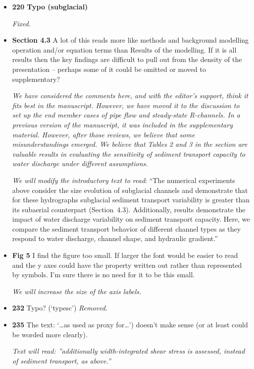 \documentclass[11pt]{article}
\begin{document}
\begin{itemize}
\item \textbf{220 Typo (subglacial)}


  \textit{Fixed.}
  
\item \textbf{Section 4.3} A lot of this reads more like methods and background modelling operation
  and/or equation terms than Results of the modelling. If it is all results then
  the key findings are difficult to pull out from the density of the presentation
  – perhaps some of it could be omitted or moved to supplementary?

  \textit{We have considered the comments here, and with the editor's support, think it fits best in the manuscript.
  However, we have moved it to the discussion to set up the end member cases of pipe flow and steady-state R-channels.
    In a previous version of the manuscript, it was included in the supplementary material. However, after those reviews, we believe that some misunderstandings emerged. We believe that Tables 2 and 3 in the section are valuable results in evaluating the sensitivity of sediment transport capacity to water discharge under different assumptions.
  }

  \textit{We will modify the introductory text to read}: ``The numerical experiments above consider the size evolution of subglacial channels and demonstrate that for these hydrographs subglacial sediment transport variability is greater than its subaerial counterpart (Section~4.3). 
Additionally, results demonstrate the impact of water discharge variability on sediment transport capacity.
Here, we compare the sediment transport behavior of different channel types as they respond to water discharge, channel shape, and hydraulic gradient.''


\item \textbf{Fig 5} I find the figure too small. If larger the font would be easier to read and the
  y axes could have the property written out rather than represented by
  symbols. I’m sure there is no need for it to be this small.

  \textit{We will increase the size of the axis labels.}

\item \textbf{232} Typo? (‘typesc’)
  \textit{Removed.}
  
\item \textbf{235} The text: ‘…as used as proxy for…’) doesn’t make sense (or at least could be
  worded more clearly).

\textit{Text will read: ''additionally width-integrated shear stress is assessed, instead of sediment transport, as above.''}
  

\end{itemize}
\end{document}
